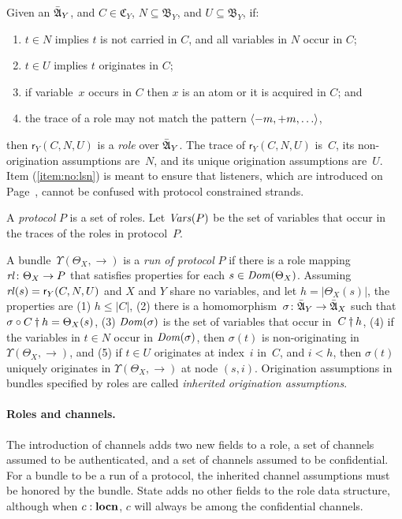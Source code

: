\documentclass[12pt]{report}
\theoremstyle{definition}
\newcommand{\algbara}{\bar{\alg{A}}}
\newcommand{\tr}{\ensuremath{\mathfrak C}}
\newcommand{\base}{\ensuremath{\mathfrak B}}
\newcommand{\sdom}{\fn{Dom}}
\newcommand{\svars}{\fn{Vars}}
\newcommand{\role}{\mathsf{r}}
\newcommand{\rl}{\fn{rl}}
\begin{document}
%
Given an $\algbara_Y$, and $C\in\tr_Y$, $N\subseteq\base_Y$, and
$U\subseteq\base_Y$, if:
%
\begin{enumerate}
  \item $t\in N$ implies $t$ is not carried in $C$, and all variables
  in $N$ occur in $C$;
  \item $t\in U$ implies $t$ originates in $C$; 
  \item if variable~$x$ occurs in $C$ then $x$ is an atom or it is
  acquired in $C$; and
  \item the trace of a role may not match the pattern\label{item:no:lsn}
  $\langle\mathord - m, \mathord + m,\ldots\rangle$, 
\end{enumerate}
%
then $\role_Y(C,N,U)$ is a \emph{role} over $\algbara_Y$.
The trace of $\role_Y(C,N,U)$ is~$C$, its non-origination assumptions
are~$N$, and its unique origination assumptions are~$U$.  Item
(\ref{item:no:lsn}) is meant to ensure that listeners, which are
introduced on Page~\pageref{def:listeners}, cannot be confused with
protocol constrained strands.

A \emph{protocol} $P$ is a set of roles.  Let
\index{Vars@\svars}$\svars(P)$ be the set of variables that occur in
the traces of the roles in protocol~$P$.

A bundle~$\Upsilon(\Theta_X,\to)$ is a \emph{run of protocol} $P$ if there is a role mapping
$\rl\colon\Theta_X\to P$ that satisfies properties for each
$s\in\sdom(\Theta_X)$.  Assuming $\rl(s)=\role_Y(C,N,U)$ and $X$ and
$Y$ share no variables, and let $h=|\Theta_X(s)|$, the properties are
(1) $h\leq|C|$, (2) there is a
homomorphism~$\sigma\colon\algbara_Y\to\algbara_X$ such that
${\mathord{\sigma}}\circ{\mathord{C\dagger h}}=\Theta_X(s)$, (3) $\sdom(\sigma)$ is the
set of variables that occur in~$C\dagger h$, (4) if the variables
in $t\in N$ occur in $\sdom(\sigma)$, then $\sigma(t)$ is
non-originating in $\Upsilon(\Theta_X,\to)$, and (5) if $t\in U$
originates at index~$i$ in~$C$, and $i<h$, then $\sigma(t)$
uniquely originates in $\Upsilon(\Theta_X,\to)$ at node $(s,i)$.
Origination assumptions in bundles specified by roles are called
\emph{inherited origination
  assumptions}.

\paragraph{Roles and channels.}  The introduction of channels adds two
new fields to a role, a set of channels assumed to be authenticated,
and a set of channels assumed to be confidential.  For a bundle to be
a run of a protocol, the inherited channel assumptions must be honored
by the bundle.  State adds no other fields to the role data structure,
although when $c :  \operatorname{\mathbf{locn}}$, $c$ will always be among the
confidential channels.
\end{document}
